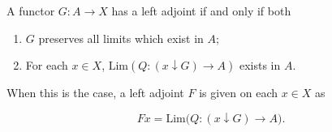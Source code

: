 A functor $G: A \to X$ has a left adjoint if and only if both

\begin{enumerate}
  \item[(i)] $G$ preserves all limits which exist in $A$;
  \item[(ii)] For each $x \in X$, $\mathrm{Lim}(Q: (x \downarrow G) \to A)$ exists in $A$.
\end{enumerate}

When this is the case, a left adjoint $F$ is given on each $x \in X$ as

$$Fx = \mathrm{Lim}\bigl(Q: (x \downarrow G) \to A\bigr).$$
